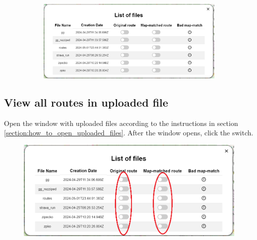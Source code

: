 \begin{figure}[H]
\begin{subfigure}{0.2\textwidth}
     \end{subfigure}
     \begin{subfigure}{0.78\textwidth}
         \centering
         \includegraphics[width=1\textwidth]{guide_includes/img/uploaded_files_window.png}
     \end{subfigure}
\end{figure}

\subsection{View all routes in uploaded file}
Open the window with uploaded files according to the instructions in section \ref{section:how_to_open_uploaded_files}. After the window opens, click the switch.
\begin{figure}[H]
     \centering
     \includegraphics[width=1\textwidth]{guide_includes/img/toggle_all_routes.png}
\end{figure}

\pagebreak
